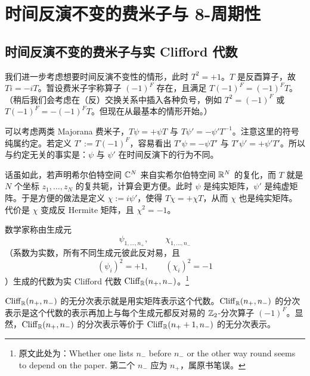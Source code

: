 
\section{时间反演不变的费米子与 8-周期性}

\subsection{时间反演不变的费米子与实 Clifford 代数}

我们进一步考虑想要时间反演不变性的情形，此时 $T^2=+1$。$T$ 是反酉算子，故 $Ti=-iT$。暂设费米子宇称算子 $(-1)^F$ 存在，且满足 $T(-1)^F=(-1)^FT$。（稍后我们会考虑在（反）交换关系中插入各种负号，例如 $T^2=(-1)^F$ 或 $T(-1)^F=-(-1)^FT$。但现在从最基本的情形开始。）

可以考虑两类 Majorana 费米子，$T\psi=+\psi T$ 与 $T\psi'=-\psi'T^{-1}$。注意这里的符号纯属约定。若定义 $T':=T(-1)^F$，容易看出 $T'\psi=-\psi T'$ 与 $T'\psi'=+\psi'T'$。所以与约定无关的事实是：$\psi$ 与 $\psi'$ 在时间反演下的行为不同。

话虽如此，若声明希尔伯特空间 $\mathbb{C}^N$ 来自实希尔伯特空间 $\mathbb{R}^N$ 的复化，而 $T$ 就是 $N$ 个坐标 $z_1,\dots,z_N$ 的复共轭，计算会更方便。此时 $\psi$ 是纯实矩阵，$\psi'$ 是纯虚矩阵。于是方便的做法是定义 $\chi:=i\psi'$，使得 $T\chi=+\chi T$，从而 $\chi$ 也是纯实矩阵。代价是 $\chi$ 变成反 Hermite 矩阵，且 $\chi^2=-1$。

数学家称由生成元
\begin{equation}
  \psi_{1,\dots,n_+},\qquad \chi_{1,\dots,n_-}
  \tag{10.18}
\end{equation}
（系数为实数，所有不同生成元彼此反对易，且
\begin{equation}
  (\psi_i)^2=+1,\qquad(\chi_i)^2=-1
  \tag{10.19}
\end{equation}
）生成的代数为实 Clifford 代数 $\mathrm{Cliff}_{\mathbb{R}}(n_+,n_-)$。\footnote{原文此处为：Whether one lists $n_-$ before $n_-$ or the other way round seems to depend on the paper. 第二个 $n_-$ 应为 $n_+$，属原书笔误。}

$\mathrm{Cliff}_{\mathbb{R}}(n_+,n_-)$ 的无分次表示就是用实矩阵表示这个代数。$\mathrm{Cliff}_{\mathbb{R}}(n_+,n_-)$ 的分次表示是这个代数的表示再加上与每个生成元都反对易的 $\mathbb{Z}_2$-分次算子 $(-1)^F$。显然，$\mathrm{Cliff}_{\mathbb{R}}(n_+,n_-)$ 的分次表示等价于 $\mathrm{Cliff}_{\mathbb{R}}(n_++1,n_-)$ 的无分次表示。

